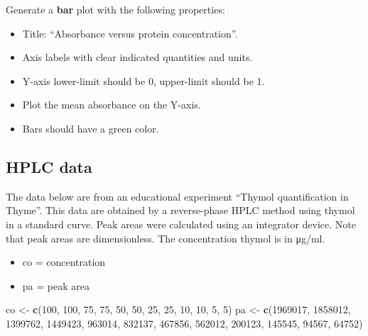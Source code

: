 \documentclass[]{book}
\newenvironment{Shaded}{\begin{snugshade}}{\end{snugshade}}
\newcommand{\DecValTok}[1]{\textcolor[rgb]{0.00,0.00,0.81}{#1}}
\newcommand{\KeywordTok}[1]{\textcolor[rgb]{0.13,0.29,0.53}{\textbf{#1}}}
\newcommand{\NormalTok}[1]{#1}
\newcommand{\StringTok}[1]{\textcolor[rgb]{0.31,0.60,0.02}{#1}}
\providecommand{\tightlist}{%
  \setlength{\itemsep}{0pt}\setlength{\parskip}{0pt}}
\begin{document}
Generate a \textbf{bar} plot with the following properties:

\begin{itemize}
\tightlist
\item
  Title: ``Absorbance versus protein concentration''.\\
\item
  Axis labels with clear indicated quantities and units.\\
\item
  Y-axis lower-limit should be 0, upper-limit should be 1.\\
\item
  Plot the mean absorbance on the Y-axis.\\
\item
  Bars should have a green color.
\end{itemize}

\hypertarget{hplc-data}{%
\subsection{HPLC data}\label{hplc-data}}

The data below are from an educational experiment ``Thymol quantification in Thyme''.
This data are obtained by a reverse-phase HPLC method using thymol in a standard curve. Peak areas were calculated using an integrator device. Note that peak areas are dimensionless. The concentration thymol is in μg/ml.

\begin{itemize}
\tightlist
\item
  co = concentration
\item
  pa = peak area
\end{itemize}

\begin{Shaded}
\begin{Highlighting}[]
\NormalTok{co <-}\StringTok{ }\KeywordTok{c}\NormalTok{(}\DecValTok{100}\NormalTok{,    }\DecValTok{100}\NormalTok{,    }\DecValTok{75}\NormalTok{, }\DecValTok{75}\NormalTok{, }\DecValTok{50}\NormalTok{, }\DecValTok{50}\NormalTok{, }\DecValTok{25}\NormalTok{, }\DecValTok{25}\NormalTok{, }\DecValTok{10}\NormalTok{, }\DecValTok{10}\NormalTok{, }\DecValTok{5}\NormalTok{, }\DecValTok{5}\NormalTok{)}
\NormalTok{pa <-}\StringTok{ }\KeywordTok{c}\NormalTok{(}\DecValTok{1969017}\NormalTok{,    }\DecValTok{1858012}\NormalTok{,    }\DecValTok{1399762}\NormalTok{,    }\DecValTok{1449423}\NormalTok{,    }\DecValTok{963014}\NormalTok{, }\DecValTok{832137}\NormalTok{, }\DecValTok{467856}\NormalTok{, }\DecValTok{562012}\NormalTok{, }\DecValTok{200123}\NormalTok{, }\DecValTok{145545}\NormalTok{, }\DecValTok{94567}\NormalTok{,  }\DecValTok{64752}\NormalTok{)}
\end{Highlighting}
\end{Shaded}
\end{document}
